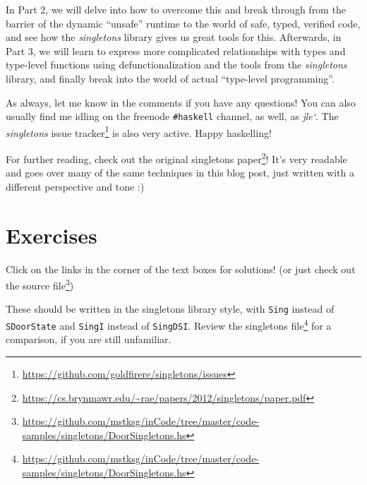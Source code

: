 \documentclass[]{article}
\renewcommand{\href}[2]{#2\footnote{\url{#1}}}
\begin{document}
In Part 2, we will delve into how to overcome this and break through from the
barrier of the dynamic ``unsafe'' runtime to the world of safe, typed, verified
code, and see how the \emph{singletons} library gives us great tools for this.
Afterwards, in Part 3, we will learn to express more complicated relationships
with types and type-level functions using defunctionalization and the tools from
the \emph{singletons} library, and finally break into the world of actual
``type-level programming''.

As always, let me know in the comments if you have any questions! You can also
usually find me idling on the freenode \texttt{\#haskell} channel, as well, as
\emph{jle`}. The \emph{singletons}
\href{https://github.com/goldfirere/singletons/issues}{issue tracker} is also
very active. Happy haskelling!

For further reading, check out the
\href{https://cs.brynmawr.edu/~rae/papers/2012/singletons/paper.pdf}{original
singletons paper}! It's very readable and goes over many of the same techniques
in this blog post, just written with a different perspective and tone :)

\section{Exercises}\label{exercises}

Click on the links in the corner of the text boxes for solutions! (or just check
out
\href{https://github.com/mstksg/inCode/tree/master/code-samples/singletons/DoorSingletons.hs}{the
source file})

These should be written in the singletons library style, with \texttt{Sing}
instead of \texttt{SDoorState} and \texttt{SingI} instead of \texttt{SingDSI}.
Review the
\href{https://github.com/mstksg/inCode/tree/master/code-samples/singletons/DoorSingletons.hs}{singletons
file} for a comparison, if you are still unfamiliar.
\end{document}

